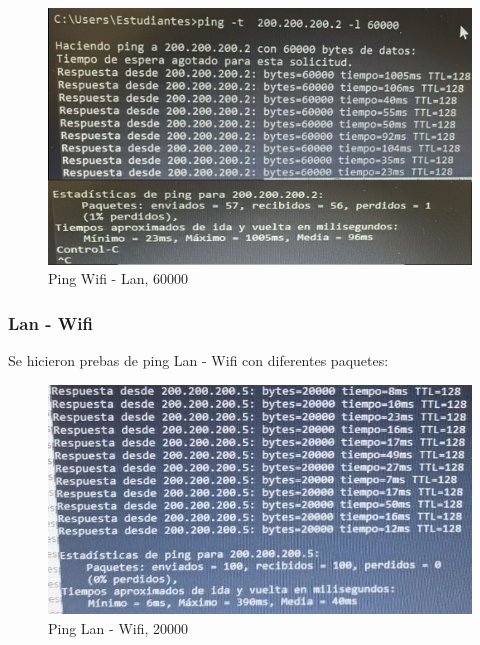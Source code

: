     \begin{figure}[H]
        \centering
        \includegraphics[width=\columnwidth]{punto1/p1_ping_wifi_lan_60k.jpeg}
        \caption{Ping Wifi - Lan, 60000}
        \label{fig:ping_wifi_lan_6k}
    \end{figure}


\subsubsection{Lan - Wifi}
Se hicieron prebas de ping Lan - Wifi con diferentes paquetes:
\begin{figure}[H]
    \centering
    \includegraphics[width=\columnwidth]{punto1/p1_ping_lan_wifi_20k.jpeg}
    \caption{Ping Lan - Wifi, 20000}
    \label{fig:ping_lan_wifi_20k}
\end{figure}

